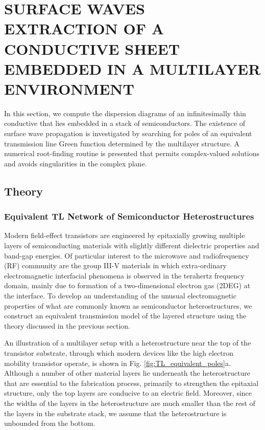 \chapter{\uppercase{Surface waves extraction of a conductive sheet embedded in a multilayer environment}}

In this section, we compute the dispersion diagrams of an infinitesimally thin conductive that lies embedded in a stack of semiconductors. The existence of surface wave propagation is investigated by searching for poles of an equivalent transmission line Green function determined by the multilayer structure. A numerical root-finding routine is presented that permits complex-valued solutions and avoids singularities in the complex plane.
%
\section{Theory}
\subsection{Equivalent TL Network of Semiconductor Heterostructures}
%
Modern field-effect transistors are engineered by epitaxially growing multiple layers of semiconducting materials with slightly different dielectric properties and band-gap energies. Of particular interest to the microwave and radiofrequency (RF) community are the group III-V materials in which extra-ordinary electromagnetic interfacial phenomena is observed in the terahertz frequency domain, mainly due to formation of a two-dimensional electron gas (2DEG) at the interface. To develop an understanding of the unusual electromagnetic properties of what are commonly known as semiconductor heterostructures, we construct an equivalent transmission model of the layered structure using the theory discussed in the previous section.

An illustration of a multilayer setup with a heterostructure near the top of the transistor substrate, through which modern devices like the high electron mobility transistor operate, is shown in Fig. \ref{fig:TL_equivalent_poles}a. Although a number of other material layers lie underneath the heterostructure that are essential to the fabrication process, primarily to strengthen the epitaxial structure, only the top layers are conducive to an electric field. Moreover, since the widths of the layers in the heterostructure are much smaller than the rest of the layers in the substrate stack, we assume that the heterostructure is unbounded from the bottom.


